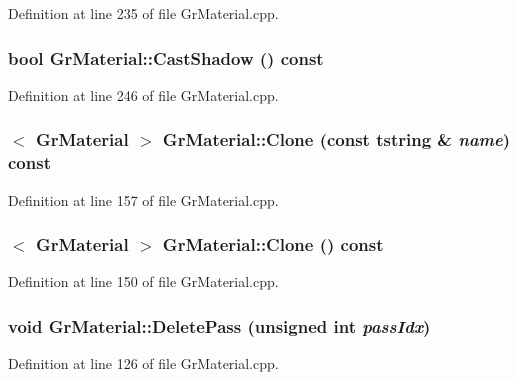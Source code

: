 \begin{CompactItemize}
Definition at line 235 of file GrMaterial.cpp.\hypertarget{class_gr_material_9f2498b4265e1c59a1abdaf03792b23a}{
\subsubsection[{CastShadow}]{\setlength{\rightskip}{0pt plus 5cm}bool GrMaterial::CastShadow () const}}
\label{class_gr_material_9f2498b4265e1c59a1abdaf03792b23a}




Definition at line 246 of file GrMaterial.cpp.\hypertarget{class_gr_material_24474e6210348ad3a58ae6032238fc1b}{
\subsubsection[{Clone}]{$<$ {\bf GrMaterial} $>$ GrMaterial::Clone (const {\bf tstring} \& {\em name}) const}}
\label{class_gr_material_24474e6210348ad3a58ae6032238fc1b}




Definition at line 157 of file GrMaterial.cpp.\hypertarget{class_gr_material_1eb04141be03a81d722d927286f9b6b3}{
\subsubsection[{Clone}]{$<$ {\bf GrMaterial} $>$ GrMaterial::Clone () const}}
\label{class_gr_material_1eb04141be03a81d722d927286f9b6b3}




Definition at line 150 of file GrMaterial.cpp.\hypertarget{class_gr_material_81b2787260c41c2581a762b04cc6c3f4}{
\subsubsection[{DeletePass}]{\setlength{\rightskip}{0pt plus 5cm}void GrMaterial::DeletePass (unsigned int {\em passIdx})}}
\label{class_gr_material_81b2787260c41c2581a762b04cc6c3f4}




Definition at line 126 of file GrMaterial.cpp.\hypertarget{class_gr_material_fc785b8aa612256266c37eb1d482f287}{
}
\end{CompactItemize}
